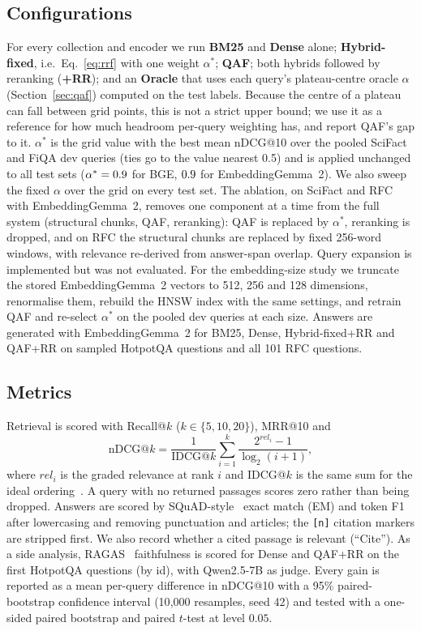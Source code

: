 \subsection{Configurations}
For every collection and encoder we run \textbf{BM25} and \textbf{Dense}
alone; \textbf{Hybrid-fixed}, i.e.\ Eq.~\eqref{eq:rrf} with one weight
$\alpha^{*}$; \textbf{QAF}; both hybrids followed by reranking
(\textbf{+RR}); and an \textbf{Oracle} that uses each query's plateau-centre
oracle $\alpha$ (Section~\ref{sec:qaf}) computed on the test labels. Because the
centre of a plateau can fall between grid points, this is not a strict upper
bound; we use it as a reference for how much headroom per-query weighting has,
and report QAF's gap to it. $\alpha^{*}$ is the grid
value with the best mean nDCG@10 over the pooled SciFact and FiQA dev queries
(ties go to the value nearest 0.5) and is applied unchanged to all test sets
($\alpha^{*}=0.9$ for BGE, $0.9$ for EmbeddingGemma~2).
We also sweep the fixed $\alpha$ over the grid on every test set.
The ablation, on SciFact and RFC with EmbeddingGemma~2, removes one component
at a time from the full system (structural chunks, QAF, reranking): QAF is
replaced by $\alpha^{*}$, reranking is dropped, and on RFC the structural
chunks are replaced by fixed 256-word windows, with relevance re-derived from
answer-span overlap. Query expansion is implemented but was not evaluated.
For the embedding-size study we truncate the stored EmbeddingGemma~2 vectors
to 512, 256 and 128 dimensions, renormalise them, rebuild the HNSW index with
the same settings, and retrain QAF and re-select $\alpha^{*}$ on the pooled
dev queries at each size. Answers are generated with EmbeddingGemma~2 for
BM25, Dense, Hybrid-fixed+RR and QAF+RR on \GenN{} sampled HotpotQA questions
and all 101 RFC questions.

\subsection{Metrics}
Retrieval is scored with Recall@$k$ ($k\in\{5,10,20\}$), MRR@10 and
\begin{equation}
  \mathrm{nDCG@}k=\frac{1}{\mathrm{IDCG@}k}\sum_{i=1}^{k}\frac{2^{\mathit{rel}_i}-1}{\log_2(i+1)},
  \label{eq:ndcg}
\end{equation}
where $\mathit{rel}_i$ is the graded relevance at rank $i$ and IDCG@$k$ is the
same sum for the ideal ordering~\cite{jarvelin2002ndcg}. A query with no
returned passages scores zero rather than being dropped. Answers are scored by
SQuAD-style~\cite{rajpurkar2016squad} exact match (EM) and token F1 after
lowercasing and removing punctuation and articles; the \texttt{[n]}
citation markers are stripped first. We also record whether a cited passage
is relevant (``Cite''). As a side analysis, RAGAS~\cite{es2024ragas}
faithfulness is scored for Dense and QAF+RR on the first \RagasN{} HotpotQA
questions (by id), with Qwen2.5-7B as judge. Every gain is reported as a mean per-query difference in nDCG@10 with a 95\%
paired-bootstrap confidence interval (10{,}000 resamples, seed 42) and tested
with a one-sided paired bootstrap and paired $t$-test at level $0.05$.

